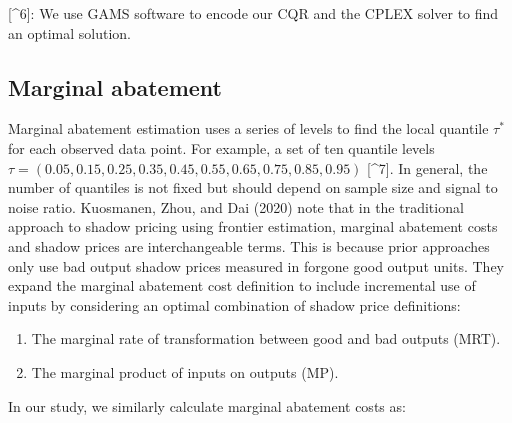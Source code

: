 \documentclass[
  letterpaper,
  DIV=11,
  numbers=noendperiod]{scrartcl}
\providecommand{\tightlist}{%
  \setlength{\itemsep}{0pt}\setlength{\parskip}{0pt}}
\begin{document}
{[}\^{}6{]}: We use GAMS software to encode our CQR and the CPLEX solver
to find an optimal solution.

\hypertarget{marginal-abatement}{%
\subsection{Marginal abatement}\label{marginal-abatement}}

Marginal abatement estimation uses a series of levels to find the local
quantile \(\tau^{*}\) for each observed data point. For example, a set
of ten quantile levels
\(\tau=(0.05,0.15,0.25,0.35,0.45,0.55,0.65,0.75,0.85,0.95)\)
{[}\^{}7{]}. In general, the number of quantiles is not fixed but should
depend on sample size and signal to noise ratio. Kuosmanen, Zhou, and
Dai (2020) note that in the traditional approach to shadow pricing using
frontier estimation, marginal abatement costs and shadow prices are
interchangeable terms. This is because prior approaches only use bad
output shadow prices measured in forgone good output units. They expand
the marginal abatement cost definition to include incremental use of
inputs by considering an optimal combination of shadow price
definitions:

\begin{enumerate}
\def\labelenumi{\arabic{enumi}.}
\tightlist
\item
  The marginal rate of transformation between good and bad outputs
  (MRT).
\item
  The marginal product of inputs on outputs (MP).
\end{enumerate}

In our study, we similarly calculate marginal abatement costs as:
\end{document}
